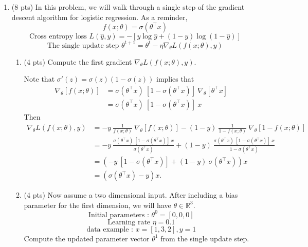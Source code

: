 \documentclass[a4paper]{article}
\theoremstyle{definition}
\newenvironment{soln}{
    \leavevmode\color{blue}\ignorespaces
}{}
\begin{document}
\begin{enumerate}
\begin{enumerate}
	\medskip

\end{enumerate}

\pagebreak

\item (8 pts) In this problem, we will walk through a single step of the gradient descent algorithm for logistic regression. As a reminder,
$$f(x;\theta) = \sigma(\theta^\top x)$$
$$\text{Cross entropy loss } L(\hat{y}, y) = -[y \log  \hat{y} + (1-y)\log(1-\hat{y})]$$
$$\text{The single update step } \theta^{t+1} = \theta^{t} - \eta \nabla_{\theta} L(f(x;\theta), y) $$



\begin{enumerate}
	\item (4 pts) Compute the first gradient $\nabla_{\theta} L(f(x;\theta), y)$.
	
	\begin{soln} Note that $\sigma'(z) = \sigma(z)(1-\sigma(z))$ implies that 
		$$\begin{aligned} 
			\nabla_{\theta}[f(x;\theta)] &= \sigma(\theta^\top x)\:[1-\sigma(\theta^\top x)]\:\nabla_{\theta}[\theta^\top x] \\[1ex]
			&= \sigma(\theta^\top x)\:[1-\sigma(\theta^\top x)]\:x
		\end{aligned}$$ Then
		$$\begin{aligned}
			\nabla_{\theta} L(f(x;\theta), y) &= - y\:\frac{1}{f(x;\theta)}\:\nabla_{\theta}[f(x;\theta)] - (1-y)\:\frac{1}{1-f(x;\theta)}\:\nabla_{\theta}[1-f(x;\theta)] \\[1ex]
			&= -y\:\frac{\sigma(\theta^\top x)\:[1-\sigma(\theta^\top x)]\:x}{\sigma(\theta^\top x)} + (1 - y)\:\frac{\sigma(\theta^\top x)\:[1-\sigma(\theta^\top x)]\:x}{1 - \sigma(\theta^\top x)} \\[1ex]
			&= \left(-y\:[1-\sigma(\theta^\top x)] + (1 - y)\:\sigma(\theta^\top x)\right)x \\[1ex]
			&= \left(\sigma(\theta^\top x) - y \right)x.
		\end{aligned}$$
	\end{soln}

	\medskip
	
	\item (4 pts)
 Now assume a two dimensional input. After including a bias parameter for the first dimension, we will have $\theta\in\mathbb{R}^3$.
$$ \text{Initial parameters : }  \theta^{0}=[0, 0, 0]$$
$$ \text{Learning rate }\eta=0.1$$
$$ \text{data example : } x=[1, 3, 2], y=1$$
Compute the updated parameter vector $\theta^{1}$ from the single update step.
	

\end{enumerate}
\end{enumerate}
\end{document}
